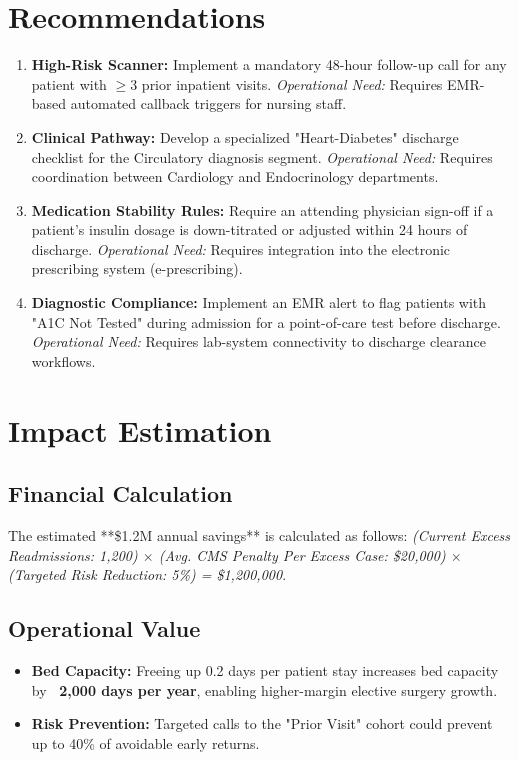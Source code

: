 \documentclass[12pt,a4paper]{article}
\begin{document}
\section{Recommendations}
\begin{enumerate}
    \item \textbf{High-Risk Scanner:} Implement a mandatory 48-hour follow-up call for any patient with $\ge 3$ prior inpatient visits. 
    \textit{Operational Need:} Requires EMR-based automated callback triggers for nursing staff.
    
    \item \textbf{Clinical Pathway:} Develop a specialized "Heart-Diabetes" discharge checklist for the Circulatory diagnosis segment. 
    \textit{Operational Need:} Requires coordination between Cardiology and Endocrinology departments.
    
    \item \textbf{Medication Stability Rules:} Require an attending physician sign-off if a patient's insulin dosage is down-titrated or adjusted within 24 hours of discharge.
    \textit{Operational Need:} Requires integration into the electronic prescribing system (e-prescribing).

    \item \textbf{Diagnostic Compliance:} Implement an EMR alert to flag patients with "A1C Not Tested" during admission for a point-of-care test before discharge.
    \textit{Operational Need:} Requires lab-system connectivity to discharge clearance workflows.
\end{enumerate}

\section{Impact Estimation}
\subsection{Financial Calculation}
The estimated **\$1.2M annual savings** is calculated as follows:
\textit{(Current Excess Readmissions: 1,200) $\times$ (Avg. CMS Penalty Per Excess Case: \$20,000) $\times$ (Targeted Risk Reduction: 5\%) = \$1,200,000}.

\subsection{Operational Value}
\begin{itemize}
    \item \textbf{Bed Capacity:} Freeing up 0.2 days per patient stay increases bed capacity by \textbf{~2,000 days per year}, enabling higher-margin elective surgery growth.
    \item \textbf{Risk Prevention:} Targeted calls to the "Prior Visit" cohort could prevent up to 40\% of avoidable early returns.
\end{itemize}
\end{document}
